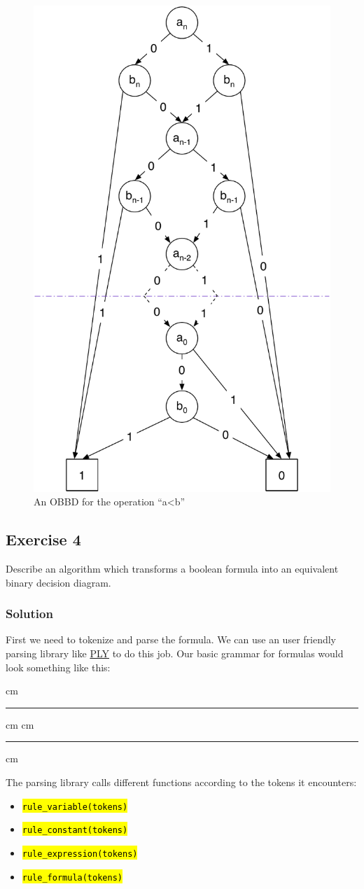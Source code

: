 \documentclass[a4paper, 11pt]{article}
\newcommand{\codeinput}[1]
{
    \vskip 0.3 cm
    {\color{lightgray}\hrule}\vskip 0.3 cm
    {\fontsize{9pt}{11pt}}
    \vskip 0.3 cm{\color{lightgray}\hrule}
    \vskip 0.3 cm
}
\newcommand{\code}[1]
{
    \hl{\texttt{#1}}
}
\begin{document}
\begin{figure}[h]
  \centering
    \includegraphics[width=.54\textwidth]{Figures/OBDD Smaller.pdf}
  \caption{An OBBD for the operation “a<b”}
  \label{fig:Figures_OBDD_Smaller}
\end{figure}

\newpage
\subsection{Exercise 4}

Describe an algorithm which transforms a boolean formula into an equivalent binary decision diagram.

\subsubsection{Solution}

First we need to tokenize and parse the formula. We can use an user friendly parsing library like \href{http://www.dabeaz.com/ply/}{PLY} to do this job. Our basic grammar for formulas would look something like this:

\codeinput{boolean_formula}

The parsing library calls different functions according to the tokens it encounters:

\begin{itemize}
    \item \code{rule\_variable(tokens)}
    \item \code{rule\_constant(tokens)}
    \item \code{rule\_expression(tokens)}
    \item \code{rule\_formula(tokens)}
\end{itemize}
\end{document}
